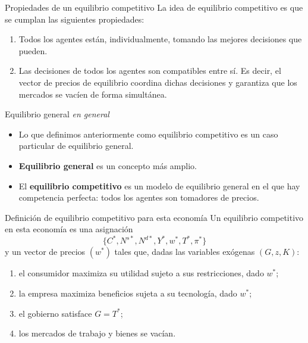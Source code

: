 \documentclass[aspectratio=169,11pt]{beamer}
\newcommand{\cidehighlight}[1]{\textcolor{CIDEBlue}{\bfseries #1}}
\newcommand{\notafuentes}[1]{\note{[Sources] #1}}
\begin{document}
\begin{frame}{Propiedades de un equilibrio competitivo}
  La idea de equilibrio competitivo es que se cumplan las siguientes propiedades:
  \begin{enumerate}
    \item Todos los agentes están, individualmente, tomando las mejores decisiones que pueden.
    \item Las decisiones de todos los agentes son compatibles entre sí. Es decir, el vector de precios de equilibrio coordina dichas decisiones y garantiza que los mercados se vacíen de forma simultánea.
  \end{enumerate}
\end{frame}

\begin{frame}{Equilibrio general \textit{en general}}
  \begin{itemize}
    \item Lo que definimos anteriormente como equilibrio competitivo es un caso particular de equilibrio general.
    \item \cidehighlight{Equilibrio general} es un concepto más amplio.
    \item El \textbf{equilibrio competitivo} es un modelo de equilibrio general en el que hay competencia perfecta: todos los agentes son tomadores de precios.
  \end{itemize}
\end{frame}

\begin{frame}{Definición de equilibrio competitivo para esta economía}
  Un equilibrio competitivo en esta economía es una asignación
  \[
    \{C^*,N^{s*},N^{d*},Y^*,w^*,T^*,\pi^*\}
  \]
  y un vector de precios $(w^*)$ tales que, dadas las variables exógenas \((G,z,K)\):
  \begin{enumerate}
    \setlength{\itemsep}{0.45em}
    \item el consumidor maximiza su utilidad sujeto a sus restricciones, dado \(w^*\);
    \item la empresa maximiza beneficios sujeta a su tecnología, dado \(w^*\);
    \item el gobierno satisface \(G=T^*\);
    \item los mercados de trabajo y bienes se vacían.
  \end{enumerate}

  \notafuentes{Williamson (2018), pp. 144--147.}
\end{frame}
\end{document}
